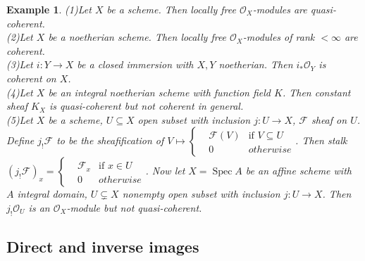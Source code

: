 \documentclass{ctexart}
\newtheorem{example}{Example}[section]
\newcommand{\spec}{\operatorname{Spec}}
\begin{document}
\begin{example}
    (1)Let $X$ be a scheme.
    Then locally free $\mathcal{O}_{X}$-modules are quasi-coherent. \\
    (2)Let $X$ be a noetherian scheme.
    Then locally free $\mathcal{O}_{X}$-modules of rank $< \infty$ are coherent. \\
    (3)Let $i: Y \longrightarrow X$ be a closed immersion with $X,Y$ noetherian.
    Then $i_{\ast}\mathcal{O}_{Y}$ is coherent on $X$. \\
    (4)Let $X$ be an integral noetherian scheme with function field $K$.
    Then constant sheaf $K_{X}$ is quasi-coherent but not coherent in general. \\
    (5)Let $X$ be a scheme, $U \subseteq X$ open subset with inclusion $j: U \longrightarrow X$, $\mathcal{F}$ sheaf on $U$.
    Define $j_{!}\mathcal{F}$ to be the sheafification of $V \longmapsto
    \left\{
        \begin{aligned}
            & \mathcal{F}(V) & \text{if } V \subseteq U \\
            & 0 & otherwise
        \end{aligned}
    \right.
    $.
    Then stalk $(j_{!}\mathcal{F})_{x} =
    \left\{
        \begin{aligned}
            & \mathcal{F}_{x} & \text{if } x\in U \\
            & 0 & otherwise
        \end{aligned}
    \right.
    $.
    Now let $X = \spec A$ be an affine scheme with $A$ integral domain, $U \subsetneq X$ nonempty open subset with inclusion $j: U \longrightarrow X$.
    Then $j_{!}\mathcal{O}_{U}$ is an $\mathcal{O}_{X}$-module but not quasi-coherent.
\end{example}

\subsection{Direct and inverse images}
\label{subsection:Sheaves_of_Modules_Direct_and_inverse_images}
\end{document}
